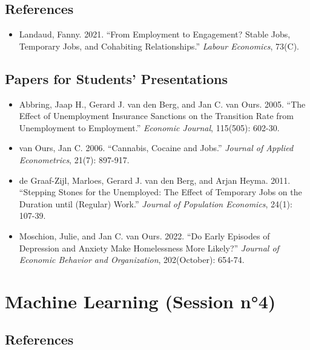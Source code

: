\documentclass[a4paper,french,11pt]{article}
\begin{document}
\subsection{References}

\begin{itemize}
	\item Landaud, Fanny. 2021. ``From Employment to Engagement? Stable Jobs, Temporary Jobs, and Cohabiting Relationships.'' \textit{Labour Economics}, 73(C).
\end{itemize}

\subsection{Papers for Students' Presentations}

\begin{itemize}
	\item Abbring, Jaap H., Gerard J. van den Berg, and Jan C. van Ours. 2005. ``The Effect of Unemployment Insurance Sanctions on the Transition Rate from Unemployment to Employment.'' \textit{Economic Journal}, 115(505): 602-30.
	\item van Ours, Jan C. 2006. ``Cannabis, Cocaine and Jobs.'' \textit{Journal of Applied Econometrics}, 21(7): 897-917.
	\item de Graaf-Zijl, Marloes, Gerard J. van den Berg, and Arjan Heyma. 2011. ``Stepping Stones for the Unemployed: The Effect of Temporary Jobs on the Duration until (Regular) Work.'' \textit{Journal of Population Economics}, 24(1): 107-39.
	\item Moschion, Julie, and Jan C. van Ours. 2022. ``Do Early Episodes of Depression and Anxiety Make Homelessness More Likely?'' \textit{Journal of Economic Behavior and Organization}, 202(October): 654-74.
\end{itemize}

\section{Machine Learning (Session n°4)}

\subsection{References}
\end{document}
